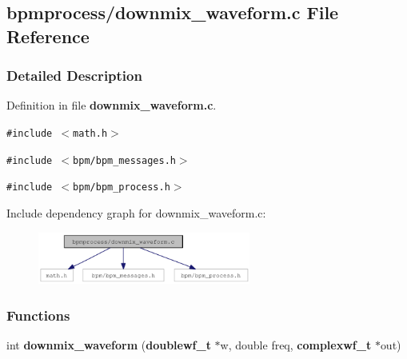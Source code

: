 \subsection{bpmprocess/downmix\_\-waveform.c File Reference}
\label{downmix__waveform_8c}


\subsubsection{Detailed Description}


Definition in file {\bf downmix\_\-waveform.c}.

{\tt \#include $<$math.h$>$}\par
{\tt \#include $<$bpm/bpm\_\-messages.h$>$}\par
{\tt \#include $<$bpm/bpm\_\-process.h$>$}\par


Include dependency graph for downmix\_\-waveform.c:\nopagebreak
\begin{figure}[H]
\begin{center}
\leavevmode
\includegraphics[width=198pt]{downmix__waveform_8c__incl}
\end{center}
\end{figure}
\subsubsection*{Functions}
\begin{CompactItemize}
\item 
int {\bf downmix\_\-waveform} ({\bf doublewf\_\-t} $\ast$w, double freq, {\bf complexwf\_\-t} $\ast$out)
\end{CompactItemize}
